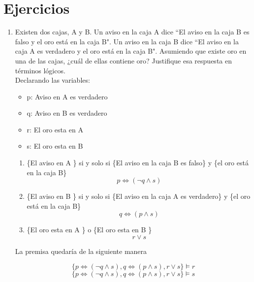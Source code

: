 \documentclass{article}
\begin{document}
	\section{Ejercicios}\label{sec:ejercicios}
	\begin{enumerate}

		\item Existen dos cajas, A y B. Un aviso en la caja A dice ``El aviso en la caja B es falso y el oro está en la caja B". Un aviso en la caja B dice ``El aviso en la caja A es verdadero y el oro está en la caja B". Asumiendo que existe oro en una de las cajas, ¿cuál de ellas contiene oro? Justifique esa respuesta en términos lógicos.
		\\
		Declarando las variables:
		\begin{itemize}
		    \item p: Aviso en A es verdadero
		    \item q: Aviso en B es verdadero
		    \item r: El oro esta en A
		    \item s: El oro esta en B
		\end{itemize}
		\begin{enumerate}
		    \item \{El aviso en A \} si y solo si \{El aviso en la caja B es falso\} y \{el oro está en la caja B\}
    		    \[ p \Leftrightarrow (\neg q \land s) \]
		        
		    \item \{El aviso en B \} si y solo si \{El aviso en la caja A es verdadero\} y \{el oro está en la caja B\}
		        \[
		            q \Leftrightarrow (p \land s)
		        \]
		        
		    \item \{El oro esta en A \} o \{El oro esta en B \}
		         \[
		            r \lor s
		        \]
		\end{enumerate}
		
		La premisa quedaría de la siguiente manera
		
		        \begin{equation}
		            \{  p \Leftrightarrow (\neg q \land s) , q \Leftrightarrow (p \land s) ,  r \lor s \} \models r
		        \end{equation}
		        \begin{equation}
		            \{  p \Leftrightarrow (\neg q \land s) , q \Leftrightarrow (p \land s) ,  r \lor s \} \models s
		        \end{equation}
		

\end{enumerate}
\end{document}
